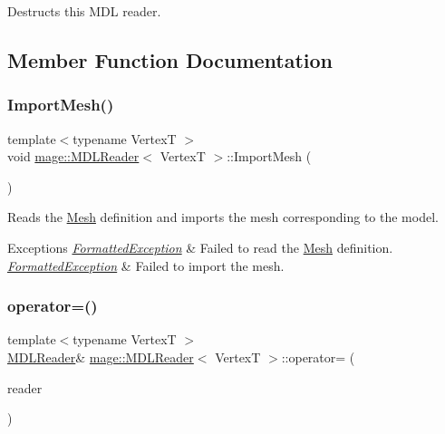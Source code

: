 Destructs this M\+DL reader. 

\subsection{Member Function Documentation}
\hypertarget{classmage_1_1_m_d_l_reader_ab688ce530cab867d155b696b2a1133a0}{}\label{classmage_1_1_m_d_l_reader_ab688ce530cab867d155b696b2a1133a0} 
\subsubsection{\texorpdfstring{Import\+Mesh()}{ImportMesh()}}
{\footnotesize\ttfamily template$<$typename VertexT $>$ \\
void \hyperlink{classmage_1_1_m_d_l_reader}{mage\+::\+M\+D\+L\+Reader}$<$ VertexT $>$\+::Import\+Mesh (\begin{DoxyParamCaption}{ }\end{DoxyParamCaption})\hspace{0.3cm}{\ttfamily [private]}}

Reads the \hyperlink{classmage_1_1_mesh}{Mesh} definition and imports the mesh corresponding to the model.


\begin{DoxyExceptions}{Exceptions}
{\em \hyperlink{classmage_1_1_formatted_exception}{Formatted\+Exception}} & Failed to read the \hyperlink{classmage_1_1_mesh}{Mesh} definition. \\
\hline
{\em \hyperlink{classmage_1_1_formatted_exception}{Formatted\+Exception}} & Failed to import the mesh. \\
\hline
\end{DoxyExceptions}
\hypertarget{classmage_1_1_m_d_l_reader_a8cc5e9966283f3f9727fa28a75412ddb}{}\label{classmage_1_1_m_d_l_reader_a8cc5e9966283f3f9727fa28a75412ddb} 
\subsubsection{\texorpdfstring{operator=()}{operator=()}\hspace{0.1cm}{\footnotesize\ttfamily [1/2]}}
{\footnotesize\ttfamily template$<$typename VertexT $>$ \\
\hyperlink{classmage_1_1_m_d_l_reader}{M\+D\+L\+Reader}\& \hyperlink{classmage_1_1_m_d_l_reader}{mage\+::\+M\+D\+L\+Reader}$<$ VertexT $>$\+::operator= (\begin{DoxyParamCaption}\item[{const \hyperlink{classmage_1_1_m_d_l_reader}{M\+D\+L\+Reader}$<$ VertexT $>$ \&}]{reader }\end{DoxyParamCaption})\hspace{0.3cm}{\ttfamily [delete]}}

